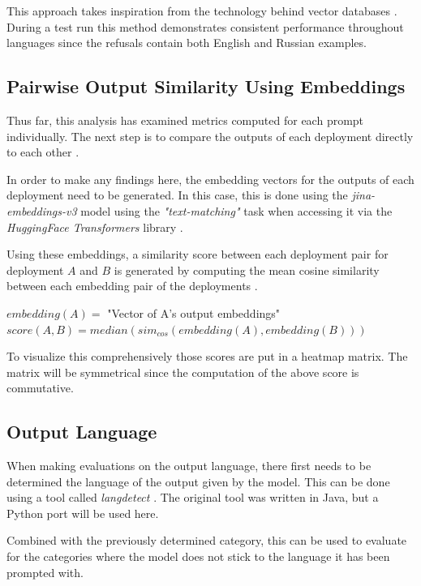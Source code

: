 This approach takes inspiration from the technology behind vector databases \cite{xieBriefSurveyVector2023}. During a test run this method demonstrates consistent performance throughout languages since the refusals contain both English and Russian examples.

\subsection{Pairwise Output Similarity Using Embeddings}

Thus far, this analysis has examined metrics computed for each prompt individually. The next step is to compare the outputs of each deployment directly to each other \cite{sitikhuComparisonSemanticSimilarity2019}.

In order to make any findings here, the embedding vectors for the outputs of each deployment need to be generated. In this case, this is done using the \textit{jina-embeddings-v3} model using the \textit{"text-matching"} task when accessing it via the \textit{HuggingFace Transformers} library \autocite{sturuaJinaembeddingsv3MultilingualEmbeddings2024,jainIntroductionTransformersNLP2022}.

Using these embeddings, a similarity score between each deployment pair for deployment $A$ and $B$ is generated by computing the mean cosine similarity between each embedding pair of the deployments \autocite{parkMethodologyCombiningCosine2020}.

\begin{center}
	$embedding(A) =$ "Vector of A's output embeddings"
	\break
	$score(A, B) = median(sim_{cos}(embedding(A), embedding(B)))$
\end{center}

To visualize this comprehensively those scores are put in a heatmap matrix. The matrix will be symmetrical since the computation of the above score is commutative.

\subsection{Output Language}

When making evaluations on the output language, there first needs to be determined the language of the output given by the model. This can be done using a tool called \textit{langdetect} \cite{shuyoLanguageDetectionLibrary2010}. The original tool was written in Java, but a Python port will be used here.

Combined with the previously determined category, this can be used to evaluate for the categories where the model does not stick to the language it has been prompted with.

